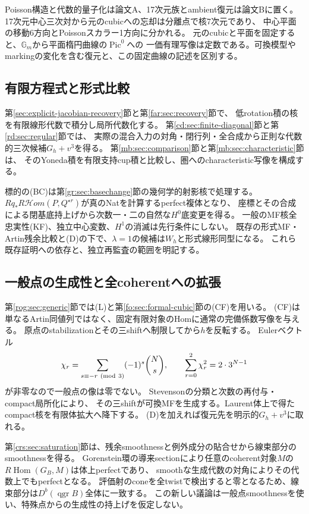 Poisson構造と代数的量子化は論文A、17次元族とambient復元は論文Bに置く。
17次元中心三次対から元のcubicへの忘却は分離点で核7次元であり、
中心平面の移動6方向とPoissonスカラー1方向に分かれる。
元のcubicと平面を固定すると、$\mathbb G_m$から平面楕円曲線の$\operatorname{Pic}^0$への
一価有理写像は定数である。可換模型やmarkingの変化を含む復元と、この固定曲線の記述を区別する。

\subsection{有限方程式と形式比較}
第\ref{sec:explicit-jacobian-recovery}節と第\ref{far:sec:recovery}節で、
低rotation積の核を有限線形代数で積分し局所代数化する。
第\ref{cd:sec:finite-diagonal}節と第\ref{rd:sec:regular}節では、
実際の混合入力の対角・閉行列・全合成から正則な代数的三次候補$G_h+v^3$を得る。
第\ref{mb:sec:comparison}節と第\ref{mb:sec:characteristic}節は、
そのYoneda積を有限支持cup積と比較し、圏へのcharacteristic写像を構成する。

標的の(BC)は第\ref{gr:sec:basechange}節の幾何学的射影核で処理する。
$Rq_*R\mathcal Hom(P,Q^{\star r})$が真のNatを計算するperfect複体となり、
座標とその合成による閉基底持上げから次数一・二の自然な$H^0$底変更を得る。
一般のMF核全忠実性(KF)、独立中心変数、$H^1$の消滅は先行条件にしない。
既存の形式MF・Artin残余比較と(D)の下で、$\lambda=1$の候補は$W_h$と形式線形同型になる。
これら既存証明への依存と、独立再監査の範囲を明記する。

\subsection{一般点の生成性と全coherentへの拡張}
第\ref{rog:sec:generic}節では(L)と第\ref{fo:sec:formal-cubic}節の(CF)を用いる。
(CF)は単なるArtin同値列ではなく、固定有限対象のHomに通常の完備係数写像を与える。
原点のstabilizationとその三shiftへ制限してから$h$を反転する。
Eulerベクトル
\[
 \chi_r=\sum_{s\equiv-r\ ({\rm mod}\ 3)}(-1)^s\binom Ns,
 \qquad \sum_{r=0}^2\chi_r^2=2\cdot3^{N-1}
\]
が非零なので一般点の像は零でない。
Stevensonの分類\cite{ROGStevenson}と次数の再付与・compact局所化により、
その三shiftが可換MFを生成する。Laurent体上で得たcompact核を有限体拡大へ降下する。
(D)を加えれば復元先を明示的$G_h+v^3$に取れる。

第\ref{crs:sec:saturation}節は、残余smoothnessと例外成分の貼合せから線束部分のsmoothnessを得る。
Gorenstein環の導来sectionにより任意のcoherent対象$M$の$R\operatorname{Hom}(G_B,M)$は体上perfectであり、
smoothな生成代数の対角によりその代数上でもperfectとなる。
評価射のconeを全twistで検出すると零となるため、線束部分は$D^b(\operatorname{qgr}B)$全体に一致する。
この新しい議論は一般点smoothnessを使い、特殊点からの生成性の持上げを仮定しない。

